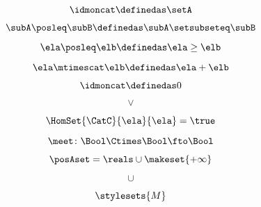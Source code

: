 {\begin{forslides}
    \begin{equation}
        \label{eq:slides_enrichment_33}
        \idmoncat \definedas \setA
    \end{equation}

    \begin{equation}
        \label{eq:slides_enrichment_34}
        \subA \posleq \subB \definedas \subA \setsubseteq \subB
    \end{equation}

    \begin{equation}
        \label{eq:slides_enrichment_35}
        \ela \posleq \elb \definedas \ela \geq \elb
    \end{equation}

    \begin{equation}
        \label{eq:slides_enrichment_36}
        \ela \mtimescat \elb \definedas \ela + \elb
    \end{equation}

    \begin{equation}
        \label{eq:slides_enrichment_37}
        \idmoncat \definedas 0
    \end{equation}

    \begin{equation}
        \label{eq:slides_enrichment_38}
        \vee
    \end{equation}

    \begin{equation}
        \label{eq:slides_enrichment_39}
        \HomSet{\CatC}{\ela}{\ela} = \true
    \end{equation}

    \begin{equation}
        \label{eq:slides_enrichment_40}
        \meet \colon \Bool \Ctimes \Bool \fto \Bool
    \end{equation}

    \begin{equation}
        \label{eq:slides_enrichment_41}
        \posAset = \reals \cup \makeset{+ \infty}
    \end{equation}

    \begin{equation}
        \label{eq:slides_enrichment_42}
        \cup
    \end{equation}

    \begin{equation}
        \label{eq:slides_enrichment_43}
        \stylesets{M}
    \end{equation}


\end{forslides}}
